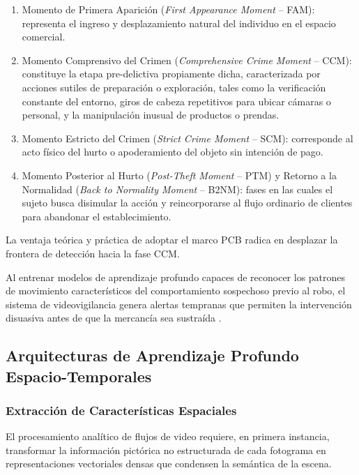\begin{enumerate}
    \item Momento de Primera Aparición (\textit{First Appearance Moment} -- FAM): representa el ingreso y desplazamiento natural del individuo en el espacio comercial.

    \item Momento Comprensivo del Crimen (\textit{Comprehensive Crime Moment} -- CCM): constituye la etapa pre-delictiva propiamente dicha, caracterizada por acciones sutiles de preparación o exploración, tales como la verificación constante del entorno, giros de cabeza repetitivos para ubicar cámaras o personal, y la manipulación inusual de productos o prendas.

    \item Momento Estricto del Crimen (\textit{Strict Crime Moment} -- SCM): corresponde al acto físico del hurto o apoderamiento del objeto sin intención de pago.

    \item Momento Posterior al Hurto (\textit{Post-Theft Moment} -- PTM) y Retorno a la Normalidad (\textit{Back to Normality Moment} -- B2NM): fases en las cuales el sujeto busca disimular la acción y reincorporarse al flujo ordinario de clientes para abandonar el establecimiento.
\end{enumerate}

La ventaja teórica y práctica de adoptar el marco PCB radica en desplazar la frontera de detección hacia la fase CCM.

Al entrenar modelos de aprendizaje profundo capaces de reconocer los patrones de movimiento característicos del comportamiento sospechoso previo al robo, el sistema de videovigilancia genera alertas tempranas que permiten la intervención disuasiva antes de que la mercancía sea sustraída \cite{chinthulla_deep_2025}.


\subsection{Arquitecturas de Aprendizaje Profundo Espacio-Temporales}

\subsubsection{Extracción de Características Espaciales}

El procesamiento analítico de flujos de video requiere, en primera instancia, transformar la información pictórica no estructurada de cada fotograma en representaciones vectoriales densas que condensen la semántica de la escena.

